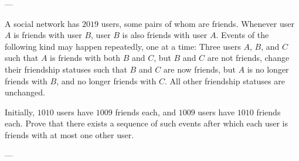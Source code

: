 
---

A social network has $2019$ users, some pairs of whom are friends. Whenever user $A$ is friends with user $B$, user $B$ is also friends with user $A$. Events of the following kind may happen repeatedly, one at a time: Three users $A$, $B$, and $C$ such that $A$ is friends with both $B$ and $C$, but $B$ and $C$ are not friends, change their friendship statuses such that $B$ and $C$ are now friends, but $A$ is no longer friends with $B$, and no longer friends with $C$. All other friendship statuses are unchanged.

Initially, $1010$ users have $1009$ friends each, and $1009$ users have $1010$ friends each. Prove that there exists a sequence of such events after which each user is friends with at most one other user.

---

